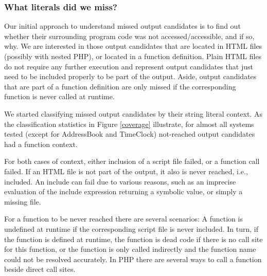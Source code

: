 \documentclass[sigconf]{acmart}
\begin{document}
\subsubsection{What literals did we miss?}\label{WhatLiteralsDidWeMiss?}
Our initial approach to understand missed output candidates is to find out
whether their surrounding program code was not accessed/accessible, and if so,
why. We are interested in those output candidates that are located in HTML
files (possibly with nested PHP), or located in a function definition. Plain
HTML files do not require any further execution and represent output candidates
that just need to be included properly to be part of the output. Aside, output
candidates that are part of a function definition are only missed if the
corresponding function is never called at runtime.

We started classifying missed output candidates by their string literal
context. As the classification statistics in Figure \ref{coverage} illustrate,
for almost all systems tested (except for \textsf{AddressBook} and
\textsf{TimeClock}) not-reached output candidates had a function context. 


For both cases of context, either inclusion of a script file failed, or a
function call failed. If an HTML file is not part of the output, it also is
never reached, i.e., included. An include can fail due to various reasons, such
as an imprecise evaluation of the include expression returning a symbolic
value, or simply a missing file.

For a function to be never reached there are several scenarios: A function is
undefined at runtime if the corresponding script file is never included. In
turn, if the function is defined at runtime, the function is dead
code if there is no call site for this function, or the function is only called
indirectly and the function name could not be resolved accurately. In PHP there
are several ways to call a function beside direct call sites. 
\end{document}
